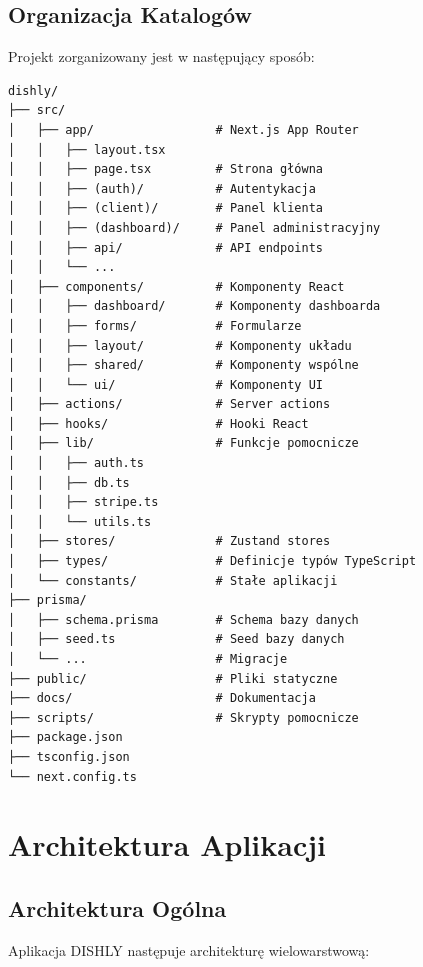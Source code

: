 \documentclass[12pt,a4paper,utf-8]{article}
\begin{document}
\subsection{Organizacja Katalogów}

Projekt zorganizowany jest w następujący sposób:

\begin{verbatim}
dishly/
├── src/
│   ├── app/                 # Next.js App Router
│   │   ├── layout.tsx
│   │   ├── page.tsx         # Strona główna
│   │   ├── (auth)/          # Autentykacja
│   │   ├── (client)/        # Panel klienta
│   │   ├── (dashboard)/     # Panel administracyjny
│   │   ├── api/             # API endpoints
│   │   └── ...
│   ├── components/          # Komponenty React
│   │   ├── dashboard/       # Komponenty dashboarda
│   │   ├── forms/           # Formularze
│   │   ├── layout/          # Komponenty układu
│   │   ├── shared/          # Komponenty wspólne
│   │   └── ui/              # Komponenty UI
│   ├── actions/             # Server actions
│   ├── hooks/               # Hooki React
│   ├── lib/                 # Funkcje pomocnicze
│   │   ├── auth.ts
│   │   ├── db.ts
│   │   ├── stripe.ts
│   │   └── utils.ts
│   ├── stores/              # Zustand stores
│   ├── types/               # Definicje typów TypeScript
│   └── constants/           # Stałe aplikacji
├── prisma/
│   ├── schema.prisma        # Schema bazy danych
│   ├── seed.ts              # Seed bazy danych
│   └── ...                  # Migracje
├── public/                  # Pliki statyczne
├── docs/                    # Dokumentacja
├── scripts/                 # Skrypty pomocnicze
├── package.json
├── tsconfig.json
└── next.config.ts
\end{verbatim}

\newpage

\section{Architektura Aplikacji}

\subsection{Architektura Ogólna}

Aplikacja DISHLY następuje architekturę wielowarstwową:
\end{document}
